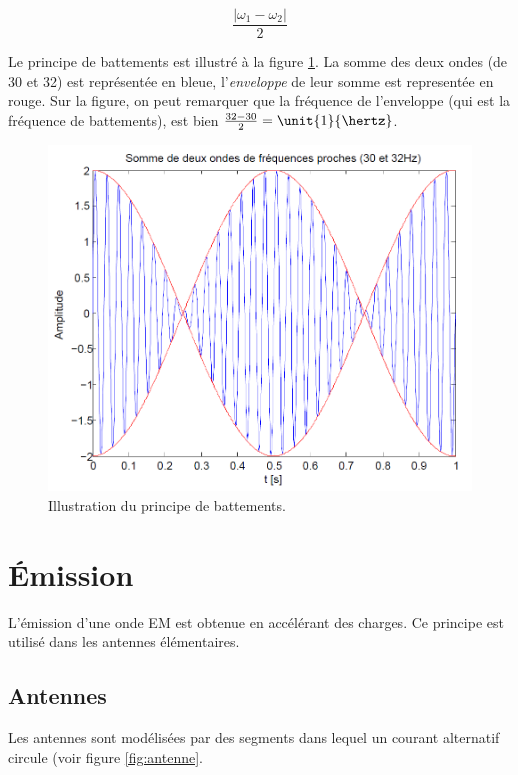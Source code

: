 $$\frac{|\omega_1 - \omega_2|}{2}$$

Le principe de battements est illustré à la figure \ref{fig:battements}.
La somme des deux ondes (de \unit{30}{\hertz} et \unit{32}{\hertz})
est représentée en bleue, l'\emph{enveloppe} de leur somme est representée en rouge.
Sur la figure, on peut remarquer que la fréquence de l'enveloppe (qui est la
fréquence de battements), est bien $\frac{32-30}{2} = \unit{1}{\hertz}$.

\begin{figure}[ht!]
	\centering
	\includegraphics[scale=0.7]{img/battements.png}
	\caption{Illustration du principe de battements.}
	\label{fig:battements}
\end{figure}

\section{Émission}
L'émission d'une onde EM est obtenue en accélérant des charges.
Ce principe est utilisé dans les antennes élémentaires.

\subsection{Antennes}
Les antennes sont modélisées par des segments dans lequel un courant
alternatif circule (voir figure \ref{fig:antenne}.

